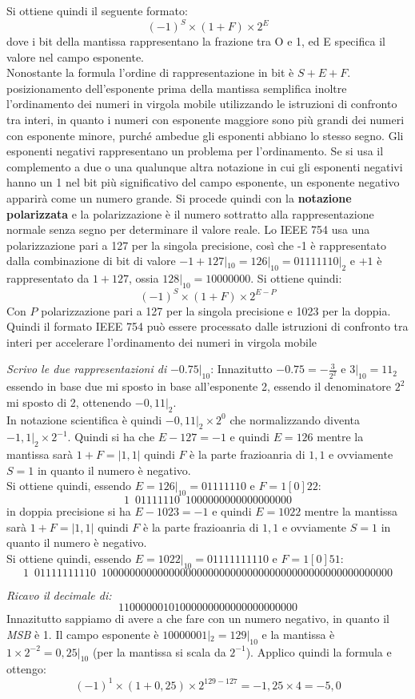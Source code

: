 \documentclass[a4paper,12pt, oneside]{book}
\begin{document}
Si ottiene quindi il seguente formato:
\[(-1)^S\times (1+F) \times 2^E\]
dove i bit della mantissa rappresentano la frazione tra O e 1, ed E specifica il valore nel campo esponente.\\
Nonostante la formula l'ordine di rappresentazione in bit è $S+ E +F$.\\
posizionamento dell'esponente prima della mantissa semplifica inoltre l'ordinamento dei numeri in virgola mobile utilizzando le istruzioni di confronto tra
interi, in quanto i numeri con esponente maggiore sono più grandi dei numeri con esponente minore, purché ambedue gli esponenti abbiano lo stesso segno.
Gli esponenti negativi rappresentano un problema per l'ordinamento. Se si usa il complemento a due o una qualunque altra notazione in cui gli esponenti negativi hanno un 1 nel bit più significativo del campo esponente, un esponente negativo apparirà come un numero grande. Si procede quindi con la \textbf{notazione polarizzata} e la polarizzazione è il numero sottratto alla rappresentazione normale senza segno per determinare il valore reale. Lo IEEE 754 usa una polarizzazione pari a 127 per la singola precisione, così che
-1 è rappresentato dalla combinazione di bit di valore $-1+127|_{10}=126|_{10}=01111110|_2 $ e $+1$ è rappresentato da $1+127$, ossia $128|_{10}=10000000$. Si ottiene quindi:
\[(-1)^S\times (1+F) \times 2^{E-P}\]
Con $P$ polarizzazione pari a 127 per la singola precisione e 1023 per la doppia. Quindi il formato IEEE 754 può essere processato dalle istruzioni di confronto tra interi per accelerare l'ordinamento dei numeri in virgola mobile
\begin{esempio}
  \textit{Scrivo le due rappresentazioni di }$-0.75|_{10}$:
  Innazitutto $-0.75 = -\frac{3}{2^2}$ e $3|_{10}=11_2$ essendo in base due mi sposto in base all'esponente 2, essendo il denominatore $2^2$ mi sposto di 2, ottenendo $-0,11|_2$.\\
  In notazione scientifica è quindi $-0,11|_2\times 2^0$ che normalizzando diventa $-1,1|_2\times 2^{-1}$. Quindi si ha che $E-127 = -1$ e quindi $E=126$ mentre la mantissa sarà $1+F=|1,1|$ quindi $F$ è la parte frazioanria di $1,1$ e ovviamente $S=1$ in quanto il numero è negativo.\\
  Si ottiene quindi, essendo $E=126|_{10}= 01111110$ e $F=1[0]{22}$:
  \[1\,\,\,01111110\,\,\, 1000000000000000000 \]
  in doppia precisione si ha $E-1023 = -1$ e quindi $E=1022$ mentre la mantissa sarà $1+F=|1,1|$ quindi $F$ è la parte frazioanria di $1,1$ e ovviamente $S=1$ in quanto il numero è negativo.\\
  Si ottiene quindi, essendo $E=1022|_{10}= 01111111110$ e $F=1[0]{51}$:
  \[1\,\,\,01111111110\,\,\, 1000000000000000000000000000000000000000000000000000 \]
\end{esempio}
\begin{esempio}
  \textit{Ricavo il decimale di:}
  \[1 10000001 01000000000000000000000\]
  Innazitutto sappiamo di avere a che fare con un numero negativo, in quanto il \textit{MSB} è 1. Il campo esponente è $10000001|_2 = 129|_{10}$ e la mantissa è $1\times 2^{-2} = 0,25|_{10}$ (per la mantissa si scala da $2^{-1}$). Applico quindi la formula e ottengo:
  \[(-1)^1 \times (1+0,25) \times 2^{129-127} = -1,25 \times 4 = -5,0\]
\end{esempio}
\end{document}
